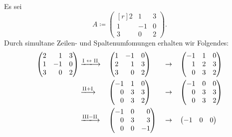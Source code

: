 \begin{example}
  \label{example: simultaneous row and column operations}
  Es sei
  \[
              A
    \coloneqq \begin{pmatrix*}[r]
                2 &  1 & 3  \\
                1 & -1 & 0  \\
                3 &  0 & 2
              \end{pmatrix*}.
  \]
  Durch simultane Zeilen- und Spaltenumfomungen erhalten wir Folgendes:
  \begin{alignat*}{4}
    \begin{pmatrix*}[r]
      2 &  1 & 3  \\
      1 & -1 & 0  \\
      3 &  0 & 2
    \end{pmatrix*}
    &
    \xlongrightarrow{\text{I $\leftrightarrow$ II}}
    &&
    \begin{pmatrix*}[r]
      1 & -1 & 0  \\
      2 &  1 & 3  \\
      3 &  0 & 2
    \end{pmatrix*}
    &&
    \to
    &&
    \begin{pmatrix*}[r]
      -1 & 1 & 0  \\
       1 & 2 & 3  \\
       0 & 3 & 2
    \end{pmatrix*}
    \\
    &
    \xlongrightarrow{\text{II} + \text{I}}
    &&
    \begin{pmatrix*}[r]
      -1 & 1 & 0  \\
       0 & 3 & 3  \\
       0 & 3 & 2
    \end{pmatrix*}
    &&
    \to
    &&
    \begin{pmatrix*}[r]
      -1 & 0 & 0  \\
       0 & 3 & 3  \\
       0 & 3 & 2
    \end{pmatrix*}
    \\
    &
    \xlongrightarrow{\text{III} - \text{II}}
    &&
    \begin{pmatrix*}[r]
      -1 & 0 &  0 \\
       0 & 3 &  3 \\
       0 & 0 & -1
    \end{pmatrix*}
    &&
    \to
    &&
    \begin{pmatrix*}[r]
      -1 & 0 &  0 \\

\end{pmatrix*}
\end{alignat*}
\end{example}
